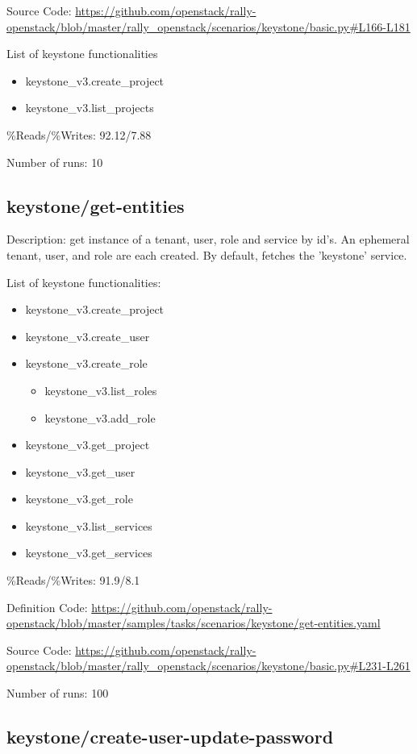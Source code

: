 Source Code: \url{https://github.com/openstack/rally-openstack/blob/master/rally\_openstack/scenarios/keystone/basic.py#L166-L181}

List of keystone functionalities
\begin{itemize}
\item    keystone\_v3.create\_project
\item    keystone\_v3.list\_projects
\end{itemize}
\%Reads/\%Writes: 92.12/7.88

Number of runs: 10

\subsection{keystone/get-entities}

Description: get instance of a tenant, user, role and service by id’s. An ephemeral tenant, user, and role are each created. By default, fetches the ’keystone’ service.

List of keystone functionalities:
\begin{itemize}
\item    keystone\_v3.create\_project
\item    keystone\_v3.create\_user
\item    keystone\_v3.create\_role
    \begin{itemize}
    \item    keystone\_v3.list\_roles
    \item    keystone\_v3.add\_role
    \end{itemize}
\item    keystone\_v3.get\_project
\item    keystone\_v3.get\_user
\item    keystone\_v3.get\_role
\item    keystone\_v3.list\_services
\item    keystone\_v3.get\_services
\end{itemize}
\%Reads/\%Writes: 91.9/8.1

Definition Code: \url{https://github.com/openstack/rally-openstack/blob/master/samples/tasks/scenarios/keystone/get-entities.yaml}

Source Code: \url{https://github.com/openstack/rally-openstack/blob/master/rally\_openstack/scenarios/keystone/basic.py#L231-L261}

Number of runs: 100


\subsection{keystone/create-user-update-password}

